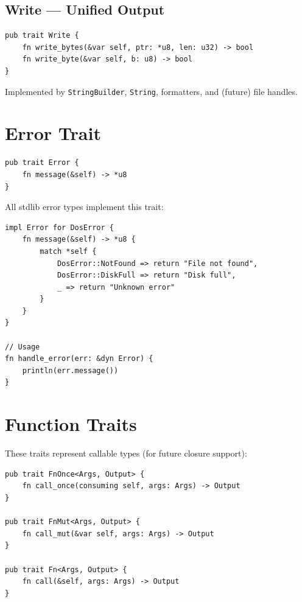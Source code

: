 \subsection{Write --- Unified Output}

\begin{lstlisting}
pub trait Write {
    fn write_bytes(&var self, ptr: *u8, len: u32) -> bool
    fn write_byte(&var self, b: u8) -> bool
}
\end{lstlisting}

Implemented by \texttt{StringBuilder}, \texttt{String}, formatters, and (future) file handles.

\section{Error Trait}
\label{sec:error-trait}

\begin{lstlisting}
pub trait Error {
    fn message(&self) -> *u8
}
\end{lstlisting}

All stdlib error types implement this trait:

\begin{lstlisting}
impl Error for DosError {
    fn message(&self) -> *u8 {
        match *self {
            DosError::NotFound => return "File not found",
            DosError::DiskFull => return "Disk full",
            _ => return "Unknown error"
        }
    }
}

// Usage
fn handle_error(err: &dyn Error) {
    println(err.message())
}
\end{lstlisting}

\section{Function Traits}
\label{sec:function-traits}

These traits represent callable types (for future closure support):

\begin{lstlisting}
pub trait FnOnce<Args, Output> {
    fn call_once(consuming self, args: Args) -> Output
}

pub trait FnMut<Args, Output> {
    fn call_mut(&var self, args: Args) -> Output
}

pub trait Fn<Args, Output> {
    fn call(&self, args: Args) -> Output
}
\end{lstlisting}

